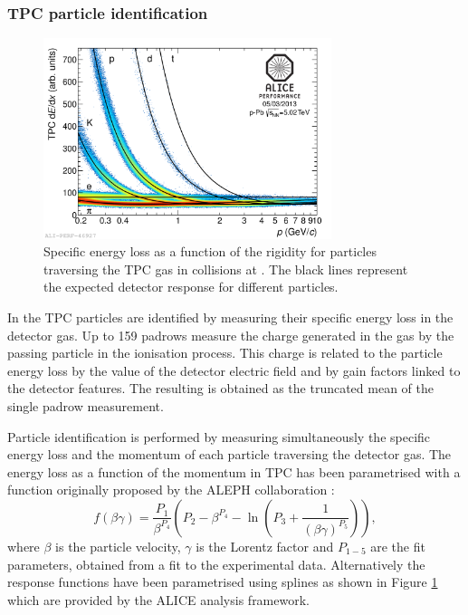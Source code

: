 \subsubsection{TPC particle identification} \label{sec:TPC_PID}

\begin{figure} 
    \centering
    \includegraphics[width=0.75\textwidth]{gfx/pid_tpc_gen}
	\caption{Specific energy loss as a function of the rigidity for particles traversing the TPC gas in \pPb collisions at \sctev. The black lines represent the expected detector response for different particles.}
	\label{fig:pid_tpc}
\end{figure}

In the TPC particles are identified by measuring their specific energy loss in the detector gas.
Up to 159 padrows measure the charge generated in the gas by the passing particle in the ionisation
process. This charge is related to the particle energy loss by the value of the detector electric
field and by gain factors linked to the detector features. 
The resulting \dedx is obtained as the truncated mean of the single padrow measurement.

Particle identification is performed by measuring simultaneously the specific energy loss \dedx 
and the momentum of each particle traversing the detector gas.
The energy loss as a function of the momentum in TPC has been parametrised with a function originally
proposed by the ALEPH collaboration \cite{aleph}:
\begin{equation} \label{eq:aleph}
    f(\beta \gamma) = \frac{P_{1}}{\beta^{P_{4}}} \left( P_{2} - \beta^{P_{4}}
    - \ln \left( P_{3} + \frac{1}{(\beta \gamma)^{P_{5}}} \right) \right),
\end{equation} 
where $\beta$ is the particle velocity, $\gamma$ is the Lorentz factor and $P_{1-5}$ are the fit
parameters, obtained from a fit to the experimental data.
Alternatively the response functions have been parametrised using splines as shown in Figure
\ref{fig:pid_tpc} which are provided by the ALICE analysis framework.

